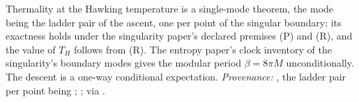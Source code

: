 Thermality at the Hawking temperature is a single-mode theorem, the mode being the ladder pair of the ascent, one per point of the singular boundary; its exactness holds under the singularity paper's declared premises (P) and (R), and the value of $T_{H}$ follows from (R). The entropy paper's clock inventory of the singularity's boundary modes gives the modular period $\beta = 8\pi M$ unconditionally. The descent is a one-way conditional expectation. \emph{Provenance:} \cite[Thm.~7.3, Rem.~7.33]{ButlerT5}, the ladder pair per point being \cite[Thm.~8.12]{ButlerT4}; \cite[Lem.~4.2]{ButlerT8}; \cite[Prop.~7.5, Thm.~7.6]{ButlerT1} via \cite[Fact~5.9]{ButlerT5}.
